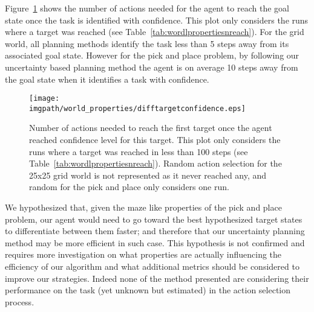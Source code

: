 Figure~\ref{fig:wordlpropertiestargetdist} shows the number of actions needed for the agent to reach the goal state once the task is identified with confidence. This plot only considers the runs where a target was reached (see Table~\ref{tab:wordlpropertiesnreach}). For the grid world, all planning methods identify the task less than 5 steps away from its associated goal state. However for the pick and place problem, by following our uncertainty based planning method the agent is on average 10 steps away from the goal state when it identifies a task with confidence.

\begin{figure}[!htbp]
\centering
\texttt{[image: \\imgpath/world\_properties/difftargetconfidence.eps]}
\caption{Number of actions needed to reach the first target once the agent reached confidence level for this target. This plot only considers the runs where a target was reached in less than 100 steps (see Table~\ref{tab:wordlpropertiesnreach}). Random action selection for the 25x25 grid world is not represented as it never reached any, and random for the pick and place only considers one run.}
\label{fig:wordlpropertiestargetdist}
\end{figure} 

We hypothesized that, given the maze like properties of the pick and place problem, our agent would need to go toward the best hypothesized target states to differentiate between them faster; and therefore that our uncertainty planning method may be more efficient in such case. This hypothesis is not confirmed and requires more investigation on what properties are actually influencing the efficiency of our algorithm and what additional metrics should be considered to improve our strategies. Indeed none of the method presented are considering their performance on the task (yet unknown but estimated) in the action selection process. 



